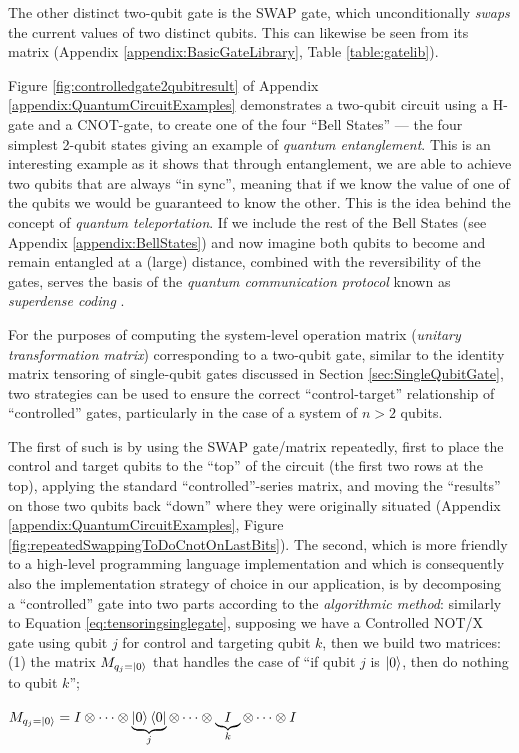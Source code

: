 \documentclass[conference]{IEEEtran}
\begin{document}
The other distinct two-qubit gate is the SWAP gate, which unconditionally
\textit{swaps} the current values of two distinct qubits. This can likewise be seen from its matrix
(Appendix \ref{appendix:BasicGateLibrary}, Table \ref{table:gatelib}).

Figure \ref{fig:controlledgate2qubitresult} of Appendix \ref{appendix:QuantumCircuitExamples} demonstrates a two-qubit circuit using a H-gate and a CNOT-gate,
to create one of the four ``Bell States'' — the four simplest 2-qubit states giving an example of
\textit{quantum entanglement}. This is an interesting example as it shows that through entanglement,
we are able to achieve two qubits that are always ``in sync'', meaning that if we know the value of one of the qubits
we would be guaranteed to know the other. This is the idea behind the concept of \textit{quantum teleportation}.
If we include the rest of the Bell States
(see Appendix \ref{appendix:BellStates}) and now imagine both qubits to become and remain entangled at a (large) distance,
combined with the reversibility of the gates,
serves the basis of the \textit{quantum communication protocol} known as
\textit{superdense coding} \cite{ref:afewnotesonbellstates}.

For the purposes of computing the system-level operation matrix (\textit{unitary transformation matrix}) corresponding to a two-qubit gate,
similar to the identity matrix tensoring of single-qubit gates discussed in Section \ref{sec:SingleQubitGate},
two strategies can be used to ensure the correct ``control-target'' relationship of ``controlled'' gates,
particularly in the case of a system of $n>2$ qubits.

The first of such is by using the SWAP gate/matrix repeatedly, first to place the control and
target qubits to the ``top'' of the circuit (the first two rows at the top),
applying the standard ``controlled''-series matrix, and moving the ``results''
on those two qubits back ``down'' where they were originally situated\cite{ref:quantumvialinearalgebra}
(Appendix \ref{appendix:QuantumCircuitExamples}, Figure \ref{fig:repeatedSwappingToDoCnotOnLastBits}).
The second, which is more friendly to a high-level programming language implementation and
which is consequently also the implementation strategy of choice in our application,
is by decomposing a ``controlled'' gate into two parts according to the
\textit{algorithmic method}\cite{ref:stackexchangealgorithmicmethod}:
similarly to Equation \ref{eq:tensoringsinglegate}, supposing we have a Controlled NOT/X gate
using qubit $j$ for control and targeting qubit $k$, then we build two matrices:
(1) the matrix $M_{q_{j}=\ket{0}}$ that handles the case of ``if qubit $j$ is $\ket{0}$, then do nothing to qubit $k$'';
\begin{center}
$
M_{q_{j}=\ket{0}}
=
I \otimes \dots
\otimes \underbrace{\ket{0}\bra{0}}_{j}
\otimes \dots
\otimes \underbrace{I}_{k}
\otimes
\dots \otimes I
$
\end{center}
\end{document}

